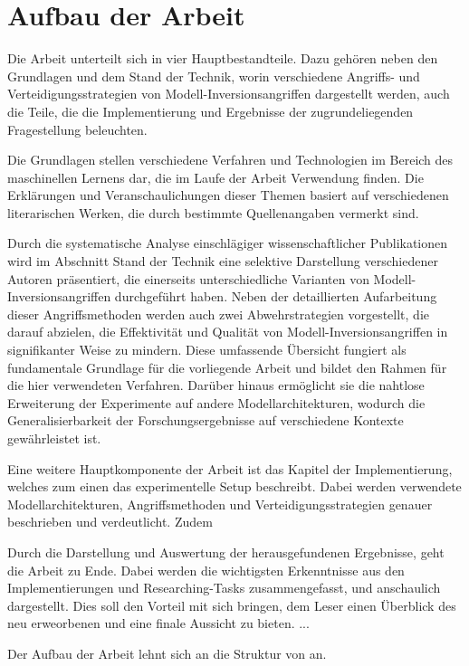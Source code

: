 \section{Aufbau der Arbeit} \label{chpt:Einleitung_Aufbau_der_Arbeit}
Die Arbeit unterteilt sich in vier Hauptbestandteile. Dazu gehören neben den \glqq Grundlagen\grqq{} und dem \glqq Stand der Technik\grqq{}, worin verschiedene Angriffs- und Verteidigungsstrategien von Modell-Inversionsangriffen dargestellt werden, auch die Teile, die die Implementierung und Ergebnisse der zugrundeliegenden Fragestellung beleuchten. 

Die \glqq Grundlagen\grqq{} stellen verschiedene Verfahren und Technologien im Bereich des maschinellen Lernens dar, die im Laufe der Arbeit Verwendung finden. Die Erklärungen und Veranschaulichungen dieser Themen basiert auf verschiedenen literarischen Werken, die durch bestimmte Quellenangaben vermerkt sind.

Durch die systematische Analyse einschlägiger wissenschaftlicher Publikationen wird im Abschnitt \glqq Stand der Technik\grqq{} eine selektive Darstellung verschiedener Autoren präsentiert, die einerseits unterschiedliche Varianten von Modell-Inversionsangriffen durchgeführt haben. Neben der detaillierten Aufarbeitung dieser Angriffsmethoden werden auch zwei Abwehrstrategien vorgestellt, die darauf abzielen, die Effektivität und Qualität von Modell-Inversionsangriffen in signifikanter Weise zu mindern. Diese umfassende Übersicht fungiert als fundamentale Grundlage für die vorliegende Arbeit und bildet den Rahmen für die hier verwendeten Verfahren. Darüber hinaus ermöglicht sie die nahtlose Erweiterung der Experimente auf andere Modellarchitekturen, wodurch die Generalisierbarkeit der Forschungsergebnisse auf verschiedene Kontexte gewährleistet ist.

Eine weitere Hauptkomponente der Arbeit ist das Kapitel der \glqq Implementierung\grqq{}, welches zum einen das experimentelle Setup beschreibt. Dabei werden verwendete Modellarchitekturen, Angriffsmethoden und Verteidigungsstrategien genauer beschrieben und verdeutlicht. Zudem 

Durch die Darstellung und Auswertung der herausgefundenen Ergebnisse, geht die Arbeit zu Ende. Dabei werden die wichtigsten Erkenntnisse aus den Implementierungen und Researching-Tasks zusammengefasst, und anschaulich dargestellt. Dies soll den Vorteil mit sich bringen, dem Leser einen Überblick des neu erweorbenen und eine finale Aussicht zu bieten. ...



Der Aufbau der Arbeit lehnt sich an die Struktur von \cite{Bar-Shalom} an.
